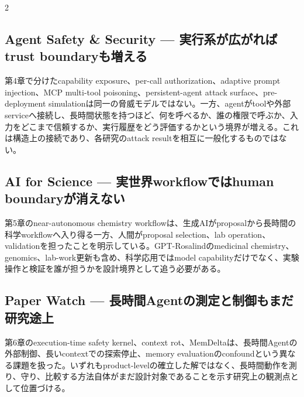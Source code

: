 \begin{multicols}{2}
\par\medskip
\subsection{Agent Safety \& Security — 実行系が広がればtrust boundaryも増える}
第4章で分けたcapability exposure、per-call authorization、adaptive prompt injection、MCP multi-tool poisoning、persistent-agent attack surface、pre-deployment simulationは同一の脅威モデルではない。一方、agentがtoolや外部serviceへ接続し、長時間状態を持つほど、何を呼べるか、誰の権限で呼ぶか、入力をどこまで信頼するか、実行履歴をどう評価するかという境界が増える。これは構造上の接続であり、各研究のattack resultを相互に一般化するものではない。 \cite{src-02da0db00c2d,src-cd4b60edfee7,src-6da0c5a88fa4,src-91b06074799d,src-c000018ba1f0}

\par\medskip
\subsection{AI for Science — 実世界workflowではhuman boundaryが消えない}
第5章のnear-autonomous chemistry workflowは、生成AIがproposalから長時間の科学workflowへ入り得る一方、人間がproposal selection、lab operation、validationを担ったことを明示している。GPT-Rosalindのmedicinal chemistry、genomics、lab-work更新も含め、科学応用ではmodel capabilityだけでなく、実験操作と検証を誰が担うかを設計境界として追う必要がある。 \cite{src-5ff2f715f1e6,src-ba562226725d}

\par\medskip
\subsection{Paper Watch — 長時間Agentの測定と制御もまだ研究途上}
第6章のexecution-time safety kernel、context rot、MemDeltaは、長時間Agentの外部制御、長いcontextでの探索停止、memory evaluationのconfoundという異なる課題を扱った。いずれもproduct-levelの確立した解ではなく、長時間動作を測り、守り、比較する方法自体がまだ設計対象であることを示す研究上の観測点として位置づける。 \cite{src-644589094c65,src-8603fd60d637,src-246f07f416dc}

\end{multicols}
\Needspace{0.34\textheight}
